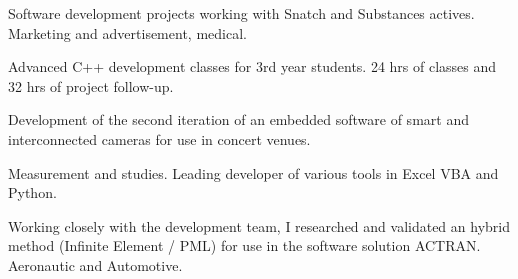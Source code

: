 \documentclass[10pt,a4paper]{altacv}
\begin{document}


\begin{fullwidth}
\makecvheader
\end{fullwidth}




Software development projects working with Snatch and Substances actives.
Marketing and advertisement, medical.\linebreak
\divider

Advanced C++ development classes for 3rd year students. 24 hrs of classes and 32 hrs of project follow-up.\linebreak
\divider

Development of the second iteration of an embedded software of smart and interconnected cameras for use in concert venues.\linebreak
\divider

Measurement and studies. Leading developer of various tools in Excel VBA and Python.\linebreak
\divider

Working closely with the development team, I researched and validated an hybrid method (Infinite Element / PML) for use in the software solution ACTRAN.\linebreak
Aeronautic and Automotive.\linebreak
\divider
\end{document}

